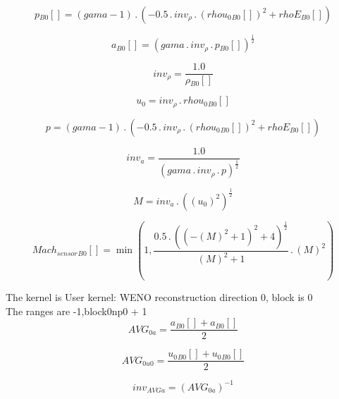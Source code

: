 \documentclass{article}
\begin{document}
\begin{dmath}{p{_{B0}}}[{}] = \left(gama - 1\right) \,.\, \left(- 0.5 \,.\, inv_{\rho} \,.\, \left({rhou_{0}{_{B0}}}[{}] \right)^{2} + {rhoE{_{B0}}}[{}]\right)\end{dmath}

\begin{dmath}{a{_{B0}}}[{}] = \left(gama \,.\, inv_{\rho} \,.\, {p{_{B0}}}[{}] \right)^{\frac{1}{2}}\end{dmath}

\begin{dmath}inv_{\rho} = \frac{1.0}{{\rho{_{B0}}}[{}]}\end{dmath}

\begin{dmath}u_{0} = inv_{\rho} \,.\, {rhou_{0}{_{B0}}}[{}]\end{dmath}

\begin{dmath}p = \left(gama - 1\right) \,.\, \left(- 0.5 \,.\, inv_{\rho} \,.\, \left({rhou_{0}{_{B0}}}[{}] \right)^{2} + {rhoE{_{B0}}}[{}]\right)\end{dmath}

\begin{dmath}inv_{a} = \frac{1.0}{\left(gama \,.\, inv_{\rho} \,.\, p \right)^{\frac{1}{2}}}\end{dmath}

\begin{dmath}M = inv_{a} \,.\, \left(\left(u_{0} \right)^{2} \right)^{\frac{1}{2}}\end{dmath}

\begin{dmath}{Mach_{sensor}{_{B0}}}[{}] = \min\left(1, \frac{0.5 \,.\, \left(\left(- \left(M \right)^{2} + 1 \right)^{2} + 4 \right)^{\frac{1}{2}}}{\left(M \right)^{2} + 1} \,.\, \left(M \right)^{2}\right)\end{dmath}

\noindent The kernel is User kernel: WENO reconstruction direction 0, block is 0\\\noindent The ranges are -1,block0np0 + 1\\\begin{dmath}AVG_{0 a} = \frac{{a{_{B0}}}[{}] + {a{_{B0}}}[{}]}{2}\end{dmath}

\begin{dmath}AVG_{0 u0} = \frac{{u_{0}{_{B0}}}[{}] + {u_{0}{_{B0}}}[{}]}{2}\end{dmath}

\begin{dmath}inv_{AVG a} = \left(AVG_{0 a} \right)^{-1}\end{dmath}
\end{document}
